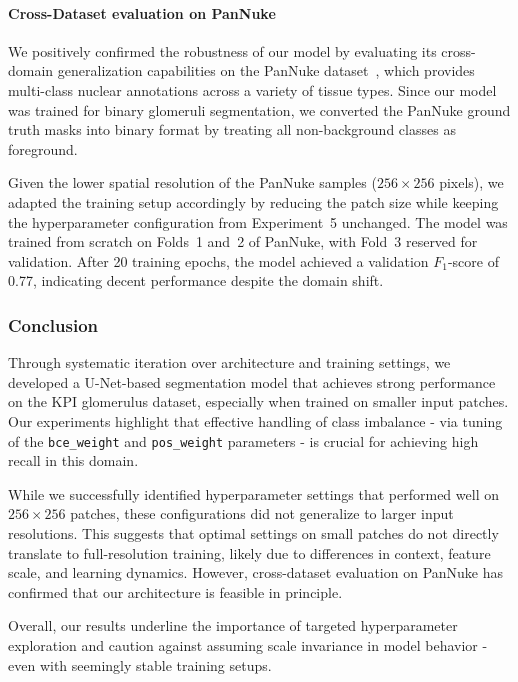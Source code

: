 \documentclass[12pt]{article}
\begin{document}
\paragraph{Cross-Dataset evaluation on PanNuke}  
We positively confirmed the robustness of our model by evaluating its cross-domain generalization capabilities on the PanNuke dataset~\cite{Gamper.2019}, which provides multi-class nuclear annotations across a variety of tissue types. Since our model was trained for binary glomeruli segmentation, we converted the PanNuke ground truth masks into binary format by treating all non-background classes as foreground.

Given the lower spatial resolution of the PanNuke samples ($256 \times 256$ pixels), we adapted the training setup accordingly by reducing the patch size while keeping the hyperparameter configuration from Experiment~5 unchanged. The model was trained from scratch on Folds~1 and~2 of PanNuke, with Fold~3 reserved for validation. After 20 training epochs, the model achieved a validation $F_1$-score of 0.77, indicating decent performance despite the domain shift.

\subsubsection{Conclusion}

Through systematic iteration over architecture and training settings, we developed a U-Net-based segmentation model that achieves strong performance on the KPI glomerulus dataset, especially when trained on smaller input patches. Our experiments highlight that effective handling of class imbalance - via tuning of the \texttt{bce\_weight} and \texttt{pos\_weight} parameters - is crucial for achieving high recall in this domain.

While we successfully identified hyperparameter settings that performed well on $256 \times 256$ patches, these configurations did not generalize to larger input resolutions. This suggests that optimal settings on small patches do not directly translate to full-resolution training, likely due to differences in context, feature scale, and learning dynamics. However, cross-dataset evaluation on PanNuke has confirmed that our architecture is feasible in principle.

Overall, our results underline the importance of targeted hyperparameter exploration and caution against assuming scale invariance in model behavior - even with seemingly stable training setups.
\end{document}
